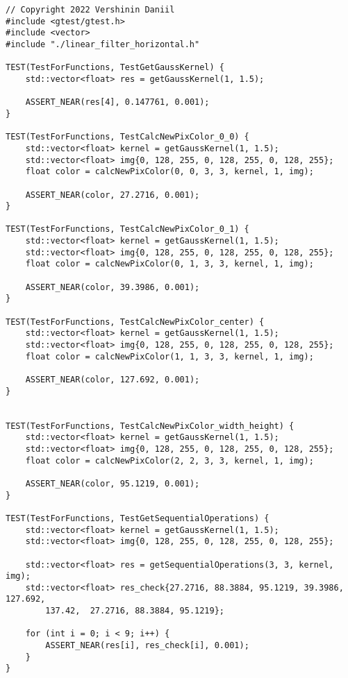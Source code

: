 \documentclass{report}
\begin{document}
\begin{lstlisting}
// Copyright 2022 Vershinin Daniil
#include <gtest/gtest.h>
#include <vector>
#include "./linear_filter_horizontal.h"

TEST(TestForFunctions, TestGetGaussKernel) {
	std::vector<float> res = getGaussKernel(1, 1.5);
	
	ASSERT_NEAR(res[4], 0.147761, 0.001);
}

TEST(TestForFunctions, TestCalcNewPixColor_0_0) {
	std::vector<float> kernel = getGaussKernel(1, 1.5);
	std::vector<float> img{0, 128, 255, 0, 128, 255, 0, 128, 255};
	float color = calcNewPixColor(0, 0, 3, 3, kernel, 1, img);
	
	ASSERT_NEAR(color, 27.2716, 0.001);
}

TEST(TestForFunctions, TestCalcNewPixColor_0_1) {
	std::vector<float> kernel = getGaussKernel(1, 1.5);
	std::vector<float> img{0, 128, 255, 0, 128, 255, 0, 128, 255};
	float color = calcNewPixColor(0, 1, 3, 3, kernel, 1, img);
	
	ASSERT_NEAR(color, 39.3986, 0.001);
}

TEST(TestForFunctions, TestCalcNewPixColor_center) {
	std::vector<float> kernel = getGaussKernel(1, 1.5);
	std::vector<float> img{0, 128, 255, 0, 128, 255, 0, 128, 255};
	float color = calcNewPixColor(1, 1, 3, 3, kernel, 1, img);
	
	ASSERT_NEAR(color, 127.692, 0.001);
}


TEST(TestForFunctions, TestCalcNewPixColor_width_height) {
	std::vector<float> kernel = getGaussKernel(1, 1.5);
	std::vector<float> img{0, 128, 255, 0, 128, 255, 0, 128, 255};
	float color = calcNewPixColor(2, 2, 3, 3, kernel, 1, img);
	
	ASSERT_NEAR(color, 95.1219, 0.001);
}

TEST(TestForFunctions, TestGetSequentialOperations) {
	std::vector<float> kernel = getGaussKernel(1, 1.5);
	std::vector<float> img{0, 128, 255, 0, 128, 255, 0, 128, 255};
	
	std::vector<float> res = getSequentialOperations(3, 3, kernel, img);
	std::vector<float> res_check{27.2716, 88.3884, 95.1219, 39.3986, 127.692,
		137.42,  27.2716, 88.3884, 95.1219};
	
	for (int i = 0; i < 9; i++) {
		ASSERT_NEAR(res[i], res_check[i], 0.001);
	}
}
\end{lstlisting}
\end{document}
